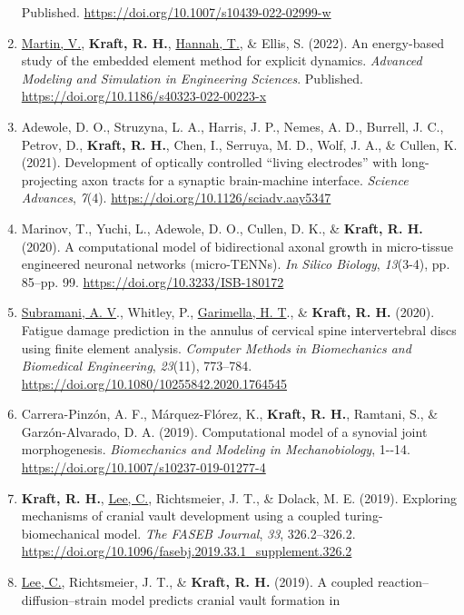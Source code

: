 \documentclass[11pt]{article}
\begin{document}
\begin{enumerate}
  Published. 
\url{https://doi.org/10.1007/s10439-022-02999-w}
\item
  \underline{Martin, V.}, \textbf{\textbf{Kraft,} R. 
H.}, \underline{Hannah, T.}, \& Ellis, S. 
(2022). 
An
  energy-based study of the embedded element method for explicit
  dynamics. 
\emph{Advanced Modeling and Simulation in Engineering
  Sciences}. 
Published. 
\url{https://doi.org/10.1186/s40323-022-00223-x}
\item
  Adewole, D. 
O., Struzyna, L. 
A., Harris, J. 
P., Nemes, A. 
D., Burrell,
  J. 
C., Petrov, D., \textbf{\textbf{Kraft,} R. 
H.}, Chen, I., Serruya, M. 
D., Wolf, J.
  A., \& Cullen, K. 
(2021). 
Development of optically controlled ``living
  electrodes'' with long-projecting axon tracts for a synaptic
  brain-machine interface. 
\emph{Science Advances}, \emph{7}(4).
  \url{https://doi.org/10.1126/sciadv.aay5347}
\item
  Marinov, T., Yuchi, L., Adewole, D. 
O., Cullen, D. 
K., \& \textbf{\textbf{Kraft,} R. 
H.}
  (2020). 
A computational model of bidirectional axonal growth in
  micro-tissue engineered neuronal networks (micro-TENNs). 
\emph{In
  Silico Biology}, \emph{13}(3-4), pp. 
85--pp. 
99.
  \url{https://doi.org/10.3233/ISB-180172}
\item
  \underline{Subramani, A. 
V}., Whitley, P., \underline{Garimella, H. 
T}., \& \textbf{\textbf{Kraft,} R. 
H.}
  (2020). 
Fatigue damage prediction in the annulus of cervical spine
  intervertebral discs using finite element analysis. 
\emph{Computer
  Methods in Biomechanics and Biomedical Engineering}, \emph{23}(11),
  773--784. 
\url{https://doi.org/10.1080/10255842.2020.1764545}
\item
  Carrera-Pinzón, A. 
F., Márquez-Flórez, K., \textbf{\textbf{Kraft,} R. 
H.}, Ramtani, S.,
  \& Garzón-Alvarado, D. 
A. 
(2019). 
Computational model of a synovial
  joint morphogenesis. 
\emph{Biomechanics and Modeling in
  Mechanobiology}, 1-\/-14.
  \url{https://doi.org/10.1007/s10237-019-01277-4}
\item
  \textbf{\textbf{Kraft,} R. 
H.}, \underline{Lee, C.}, Richtsmeier, J. 
T., \& Dolack, M. 
E. 
(2019).
  Exploring mechanisms of cranial vault development using a coupled
  turing-biomechanical model. 
\emph{The FASEB Journal}, \emph{33},
  326.2--326.2.
  \url{https://doi.org/10.1096/fasebj.2019.33.1_supplement.326.2}
\item
  \underline{Lee, C.}, Richtsmeier, J. 
T., \& \textbf{\textbf{Kraft,} R. 
H.} (2019). 
A coupled
  reaction--diffusion--strain model predicts cranial vault formation in

\end{enumerate}
\end{document}
